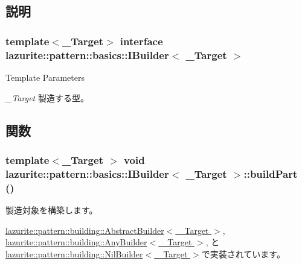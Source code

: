 \subsection{説明}
\subsubsection*{template$<$\_\-Target$>$ interface lazurite::pattern::basics::IBuilder$<$ \_\-Target $>$}


\begin{DoxyTemplParams}{Template Parameters}
\item[{\em \_\-Target}]製造する型。\end{DoxyTemplParams}


\subsection{関数}
\hypertarget{interfacelazurite_1_1pattern_1_1basics_1_1_i_builder_3_01___target_01_4_a5013ac4acdb3873bf0c7bd34803d94e0}{
\subsubsection[{buildPart}]{\setlength{\rightskip}{0pt plus 5cm}template$<$\_\-Target $>$ void lazurite::pattern::basics::IBuilder$<$ \_\-Target $>$::buildPart ()}}
\label{interfacelazurite_1_1pattern_1_1basics_1_1_i_builder_3_01___target_01_4_a5013ac4acdb3873bf0c7bd34803d94e0}


製造対象を構築します。 

\hyperlink{classlazurite_1_1pattern_1_1building_1_1_abstract_builder_3_01___target_01_4_a4ddf3d66757e93e0a410708fff784801}{lazurite::pattern::building::AbstractBuilder$<$ \_\-Target $>$}, \hyperlink{classlazurite_1_1pattern_1_1building_1_1_any_builder_3_01___target_01_4_a3c1f83ce10e846f83ab8f91d0a82300a}{lazurite::pattern::building::AnyBuilder$<$ \_\-Target $>$}, と \hyperlink{classlazurite_1_1pattern_1_1building_1_1_nil_builder_3_01___target_01_4_a569c538e03c084f2ccd3678ca368383a}{lazurite::pattern::building::NilBuilder$<$ \_\-Target $>$}で実装されています。

